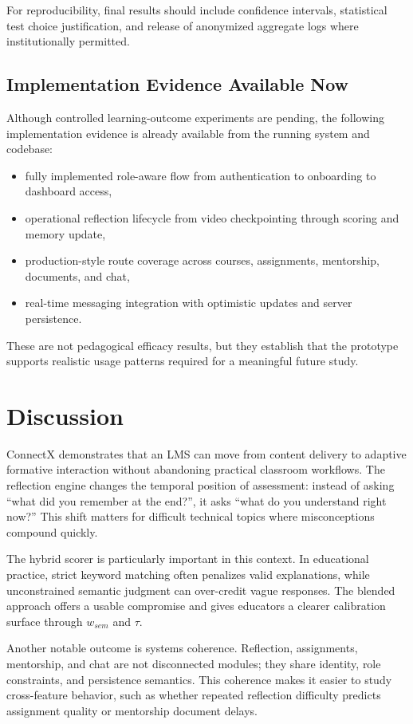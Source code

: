 \documentclass[conference]{IEEEtran}
\begin{document}
For reproducibility, final results should include confidence intervals, statistical test choice justification, and release of anonymized aggregate logs where institutionally permitted.

\subsection{Implementation Evidence Available Now}
Although controlled learning-outcome experiments are pending, the following implementation evidence is already available from the running system and codebase:
\begin{itemize}
\item fully implemented role-aware flow from authentication to onboarding to dashboard access,
\item operational reflection lifecycle from video checkpointing through scoring and memory update,
\item production-style route coverage across courses, assignments, mentorship, documents, and chat,
\item real-time messaging integration with optimistic updates and server persistence.
\end{itemize}

These are not pedagogical efficacy results, but they establish that the prototype supports realistic usage patterns required for a meaningful future study.

\section{Discussion}
ConnectX demonstrates that an LMS can move from content delivery to adaptive formative interaction without abandoning practical classroom workflows. The reflection engine changes the temporal position of assessment: instead of asking ``what did you remember at the end?'', it asks ``what do you understand right now?'' This shift matters for difficult technical topics where misconceptions compound quickly.

The hybrid scorer is particularly important in this context. In educational practice, strict keyword matching often penalizes valid explanations, while unconstrained semantic judgment can over-credit vague responses. The blended approach offers a usable compromise and gives educators a clearer calibration surface through $w_{sem}$ and $\tau$.

Another notable outcome is systems coherence. Reflection, assignments, mentorship, and chat are not disconnected modules; they share identity, role constraints, and persistence semantics. This coherence makes it easier to study cross-feature behavior, such as whether repeated reflection difficulty predicts assignment quality or mentorship document delays.
\end{document}
